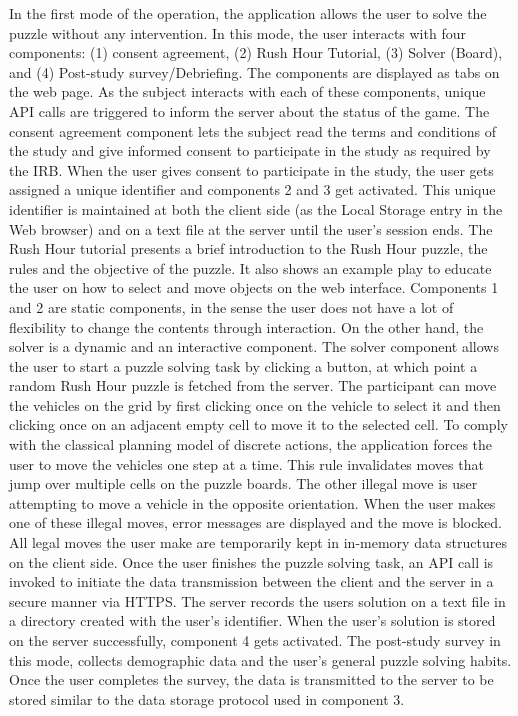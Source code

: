 \documentclass[doctor]{thesis} %
\theoremstyle{plain}
\begin{document}
In the first mode of the operation, the application allows the user to solve the puzzle without any intervention. In this mode, the user interacts with four components: (1) consent agreement, (2) Rush Hour Tutorial, (3) Solver (Board), and (4) Post-study survey/Debriefing. The components are displayed as tabs on the web page. As the subject interacts with each of these components, unique API calls are triggered to inform the server about the status of the game. The consent agreement component lets the subject read the terms and conditions of the study and give informed consent to participate in the study as required by the IRB. When the user gives consent to participate in the study, the user gets assigned a unique identifier and components 2 and 3 get activated. This unique identifier is maintained at both the client side (as the Local Storage entry in the Web browser) and on a text file at the server until the user's session ends. The Rush Hour tutorial presents a brief introduction to the Rush Hour puzzle, the rules and the objective of the puzzle. It also shows an example play to educate the user on how to select and move objects on the web interface. Components 1 and 2 are static components, in the sense the user does not have a lot of flexibility to change the contents through interaction. On the other hand, the solver is a dynamic and an interactive component. The solver component allows the user to start a puzzle solving task by clicking a button, at which point a random Rush Hour puzzle is fetched from the server. The participant can move the vehicles on the grid by first clicking once on the vehicle to select it and then clicking once on an adjacent empty cell to move it to the selected cell. To comply with the classical planning model of discrete actions, the application forces the user to move the vehicles one step at a time. This rule invalidates moves that jump over multiple cells on the puzzle boards. The other illegal move is user attempting to move a vehicle in the opposite orientation. When the user makes one of these illegal moves, error messages are displayed and the move is blocked. All legal moves the user make are temporarily kept in in-memory data structures on the client side. Once the user finishes the puzzle solving task, an API call is invoked to initiate the data transmission between the client and the server in a secure manner via HTTPS. The server records the users solution on a text file in a directory created with the user's identifier. When the user's solution is stored on the server successfully, component 4 gets activated. The post-study survey in this mode, collects demographic data and the user's general puzzle solving habits. Once the user completes the survey, the data is transmitted to the server to be stored similar to the data storage protocol used in component 3.
\end{document}
